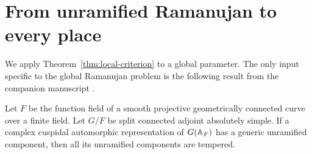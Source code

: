 \section{From unramified Ramanujan to every place}\label{sec:global}

We apply Theorem~\ref{thm:local-criterion} to a global parameter. The
only input specific to the global Ramanujan problem is the following
result from the companion manuscript \cite[Corollary~1.2]{UnramifiedRamanujan}.

\begin{theorem}
\label{thm:unramified}
Let $F$ be the function field of a smooth projective geometrically
connected curve over a finite field. Let $G/F$ be split connected
adjoint absolutely simple. If a complex cuspidal automorphic
representation of $G(\mathbb A_F)$ has a generic unramified component, then
all its unramified components are tempered.
\end{theorem}

